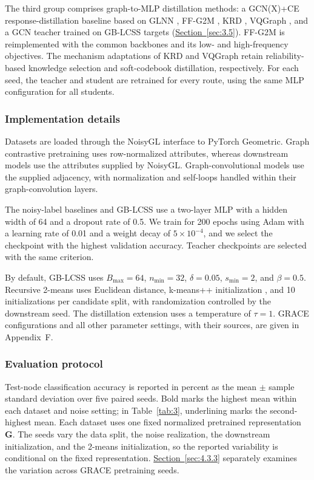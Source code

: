 \documentclass[10pt,letterpaper,nopreprintline]{elsarticle}
\theoremstyle{definition}
\theoremstyle{plain}
\begin{document}
The third group comprises graph-to-MLP distillation methods: a GCN(X)+CE response-distillation baseline based on GLNN \cite{ref4}, FF-G2M \cite{ref45}, KRD \cite{ref46}, VQGraph \cite{ref47}, and a GCN teacher trained on GB-LCSS targets (\hyperref[sec:3.5]{Section~\ref*{sec:3.5}}). FF-G2M is reimplemented with the common backbones and its low- and high-frequency objectives. The mechanism adaptations of KRD and VQGraph retain reliability-based knowledge selection and soft-codebook distillation, respectively. For each seed, the teacher and student are retrained for every route, using the same MLP configuration for all students.

\subsubsection{Implementation details}\label{sec:4.1.4}

Datasets are loaded through the NoisyGL interface to PyTorch Geometric. Graph contrastive pretraining uses row-normalized attributes, whereas downstream models use the attributes supplied by NoisyGL. Graph-convolutional models use the supplied adjacency, with normalization and self-loops handled within their graph-convolution layers.

The noisy-label baselines and GB-LCSS use a two-layer MLP with a hidden width of 64 and a dropout rate of 0.5. We train for 200 epochs using Adam with a learning rate of 0.01 and a weight decay of \(5 \times 10^{- 4}\), and we select the checkpoint with the highest validation accuracy. Teacher checkpoints are selected with the same criterion.

By default, GB-LCSS uses \(B_{\max} = 64\), \(n_{\min} = 32\), \(\delta = 0.05\), \(s_{\min} = 2\), and \(\beta = 0.5\). Recursive 2-means uses Euclidean distance, k-means++ initialization \cite{ref71}, and 10 initializations per candidate split, with randomization controlled by the downstream seed. The distillation extension uses a temperature of \(\tau = 1\). GRACE configurations and all other parameter settings, with their sources, are given in Appendix~F.

\subsubsection{Evaluation protocol}\label{sec:4.1.5}

Test-node classification accuracy is reported in percent as the mean \ensuremath{\pm} sample standard deviation over five paired seeds. Bold marks the highest mean within each dataset and noise setting; in Table~\ref{tab:3}, underlining marks the second-highest mean. Each dataset uses one fixed normalized pretrained representation \(\mathbf G\). The seeds vary the data split, the noise realization, the downstream initialization, and the 2-means initialization, so the reported variability is conditional on the fixed representation. \hyperref[sec:4.3.3]{Section~\ref*{sec:4.3.3}} separately examines the variation across GRACE pretraining seeds.
\end{document}
